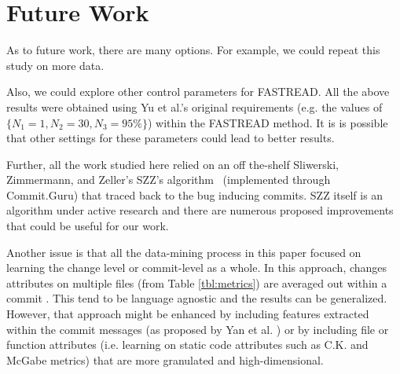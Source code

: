 \documentclass[10pt,journal,compsoc]{IEEEtran}
\begin{document}


\section{Future Work}
As to future work, there are many options.
For example, 
we could repeat this study on more data.

Also,
we could explore other control parameters for FASTREAD.
All the above results were obtained using Yu et al.'s \cite{Yu:2018} original requirements (e.g. the values of  $\{N_1=1, N_2=30, N_3=95\%\}$) within the FASTREAD method. It is  is possible that other settings for these parameters could lead to better results.

Further,
all the work studied here relied on an off the-shelf  
 Sliwerski, Zimmermann, and Zeller's SZZ's
 algorithm~\cite{costa17szz, Kim08changes, Sliwerski05changes} (implemented through Commit.Guru)
 that traced back to the  bug inducing commits.
 SZZ itself is an algorithm under active research
 and there are numerous proposed improvements \cite{costa17szz}
 that could be useful for our work.

Another issue is that all the data-mining process in this paper  focused on learning the change level or commit-level as a whole. 
In this approach,
changes attributes on multiple files  (from Table \ref{tbl:metrics}) are averaged out within a commit \cite{kamei12_jit, commitguru, nayrolles18_clever, yan18_tddetermination}. This tend to be language agnostic and the results can be generalized. However, that approach might be enhanced
by including features extracted within the commit messages
(as proposed by Yan et al. \cite{yan18_tddetermination})
or by  including file or function attributes (i.e. learning on static code attributes such as C.K. and McGabe metrics) \cite{dpmetrics94, Fu2016TuningFS, danijel13lit, Jureczko10oodp, ghotra15, nagappan05, menzies07dp, menzies10dp, krishna16bellwether, nam18tse, agrawal2019dodge, di18_fft, Tu18Tuning, agrawal2018better} that are more granulated and high-dimensional.
\end{document}
